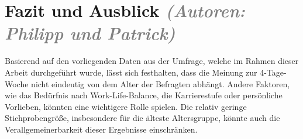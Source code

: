 \chapter{Fazit und Ausblick \textit{\textcolor{gray}{(Autoren: Philipp und Patrick)}}}


Basierend auf den vorliegenden Daten aus der Umfrage, welche im Rahmen dieser Arbeit durchgeführt wurde, 
lässt sich festhalten, dass die Meinung zur 4-Tage-Woche nicht eindeutig von dem Alter der Befragten abhängt. 
Andere Faktoren, wie das Bedürfnis nach Work-Life-Balance, die Karrierestufe oder persönliche Vorlieben, 
könnten eine wichtigere Rolle spielen. Die relativ geringe Stichprobengröße, insbesondere für die älteste 
Altersgruppe, könnte auch die Verallgemeinerbarkeit dieser Ergebnisse einschränken.
